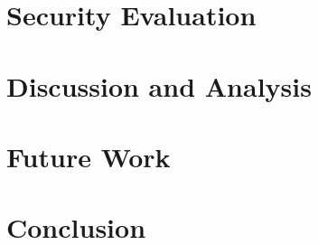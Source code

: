 \documentclass[cic,tc,english]{iiufrgs}
\begin{document}
\chapter{Security Evaluation}


\chapter{Discussion and Analysis}


\chapter{Future Work}


\chapter{Conclusion}





\end{document}
